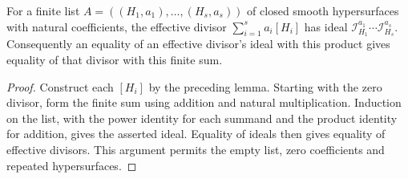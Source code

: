 \begin{theorem}
\label{hir:component-product-effective-sum}
For a finite list $A=((H_1,a_1),\ldots,(H_s,a_s))$ of closed smooth
hypersurfaces with natural coefficients, the effective divisor
$\sum_{i=1}^s a_i[H_i]$ has ideal
$\mathcal I_{H_1}^{a_1}\cdots\mathcal I_{H_s}^{a_s}$.
Consequently an equality of an effective divisor's ideal with this product
gives equality of that divisor with this finite sum.
\leanok
\end{theorem}
\begin{proof}
Construct each $[H_i]$ by the preceding lemma. Starting with the zero
divisor, form the finite sum using addition and natural multiplication.
Induction on the list, with the power identity for each summand and the
product identity for addition, gives the asserted ideal. Equality of
ideals then gives equality of effective divisors. This argument permits
the empty list, zero coefficients and repeated hypersurfaces.
\end{proof}
